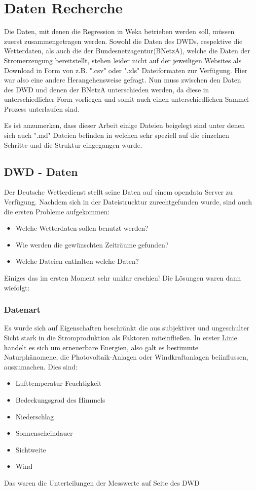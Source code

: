 \documentclass[letterpaper]{article} %
\begin{document}
\section*{Daten Recherche}
        Die Daten, mit denen die Regression in Weka betrieben werden soll, müssen zuerst zusammengetragen werden. Sowohl die Daten des DWDs, respektive die Wetterdaten, als auch die der Bundesnetzagentur(BNetzA), welche die Daten der Stromerzeugung bereitstellt, stehen leider nicht auf der jeweiligen Websites als Download in Form von z.B. ".csv" oder ".xls" Dateiformaten zur Verfügung. Hier war also eine andere Herangehensweise gefragt. Nun muss zwischen den Daten des DWD und denen der BNetzA unterschieden werden, da diese in unterschiedlicher Form vorliegen und somit auch einen unterschiedlichen Sammel-Prozess unterlaufen sind.

        Es ist anzumerken, dass dieser Arbeit einige Dateien beigelegt sind unter denen sich auch ".md" Dateien befinden in welchen sehr speziell auf die einzelnen Schritte und die Struktur eingegangen wurde.

    \subsection*{DWD - Daten}
        Der Deutsche Wetterdienst stellt seine Daten auf einem opendata Server zu Verfügung. Nachdem sich in der Dateistrucktur zurechtgefunden wurde, sind auch die ersten Probleme aufgekommen:
        \begin{itemize}
            \item Welche Wetterdaten sollen benutzt werden?
            \item Wie werden die gewünschten Zeiträume gefunden?
            \item Welche Dateien enthalten welche Daten?
        \end{itemize}
        Einiges das im ersten Moment sehr unklar erschien! Die Lösungen waren dann wiefolgt:
            \subsubsection*{Datenart}
                Es wurde sich auf Eigenschaften beschränkt die aus subjektiver und ungeschulter Sicht stark in die Stromproduktion als Faktoren miteinfließen. In erster Linie handelt es sich um erneuerbare Energien, also galt es bestimmte Naturphänomene, die Photovoltaik-Anlagen oder Windkraftanlagen beiinflussen, auszumachen. Dies sind:
                \begin{itemize}
                    \item Lufttemperatur Feuchtigkeit
                    \item Bedeckungsgrad des Himmels
                    \item Niederschlag
                    \item Sonnenscheindauer
                    \item Sichtweite
                    \item Wind
                \end{itemize}
                Das waren die Unterteilungen der Messwerte auf Seite des DWD
\end{document}

